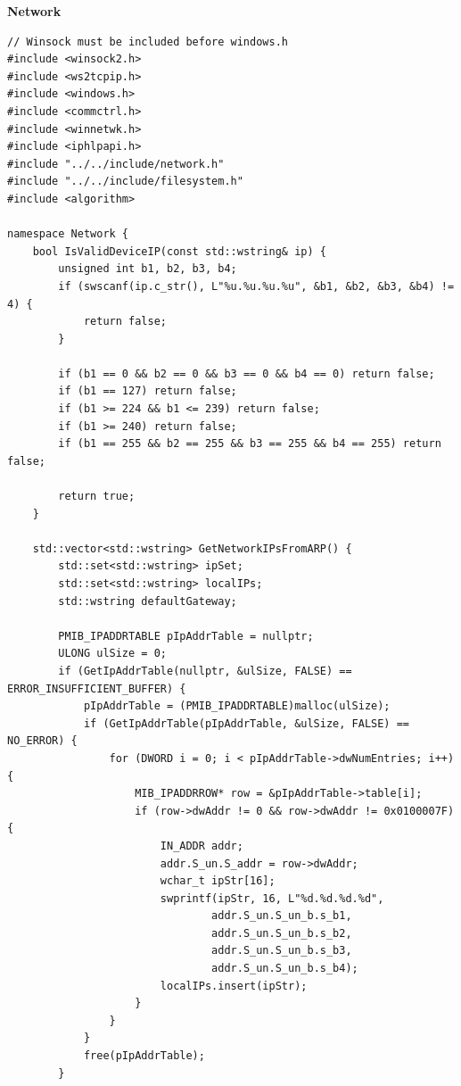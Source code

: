 \textbf{Network}
\begin{lstlisting}[style=CodeListing]
// Winsock must be included before windows.h
#include <winsock2.h>
#include <ws2tcpip.h>
#include <windows.h>
#include <commctrl.h>
#include <winnetwk.h>
#include <iphlpapi.h>
#include "../../include/network.h"
#include "../../include/filesystem.h"
#include <algorithm>

namespace Network {
    bool IsValidDeviceIP(const std::wstring& ip) {
        unsigned int b1, b2, b3, b4;
        if (swscanf(ip.c_str(), L"%u.%u.%u.%u", &b1, &b2, &b3, &b4) != 4) {
            return false;
        }
        
        if (b1 == 0 && b2 == 0 && b3 == 0 && b4 == 0) return false;
        if (b1 == 127) return false;
        if (b1 >= 224 && b1 <= 239) return false;
        if (b1 >= 240) return false;
        if (b1 == 255 && b2 == 255 && b3 == 255 && b4 == 255) return false;
        
        return true;
    }
    
    std::vector<std::wstring> GetNetworkIPsFromARP() {
        std::set<std::wstring> ipSet;
        std::set<std::wstring> localIPs;
        std::wstring defaultGateway;
        
        PMIB_IPADDRTABLE pIpAddrTable = nullptr;
        ULONG ulSize = 0;
        if (GetIpAddrTable(nullptr, &ulSize, FALSE) == ERROR_INSUFFICIENT_BUFFER) {
            pIpAddrTable = (PMIB_IPADDRTABLE)malloc(ulSize);
            if (GetIpAddrTable(pIpAddrTable, &ulSize, FALSE) == NO_ERROR) {
                for (DWORD i = 0; i < pIpAddrTable->dwNumEntries; i++) {
                    MIB_IPADDRROW* row = &pIpAddrTable->table[i];
                    if (row->dwAddr != 0 && row->dwAddr != 0x0100007F) {
                        IN_ADDR addr;
                        addr.S_un.S_addr = row->dwAddr;
                        wchar_t ipStr[16];
                        swprintf(ipStr, 16, L"%d.%d.%d.%d",
                                addr.S_un.S_un_b.s_b1,
                                addr.S_un.S_un_b.s_b2,
                                addr.S_un.S_un_b.s_b3,
                                addr.S_un.S_un_b.s_b4);
                        localIPs.insert(ipStr);
                    }
                }
            }
            free(pIpAddrTable);
        }
        

\end{lstlisting}
